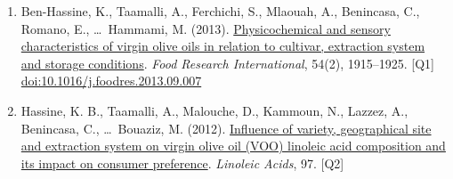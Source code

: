 \documentclass[10pt,a4paper]{article}
\newcommand{\doi}[1]{\href{https://doi.org/#1}{doi:#1}}
\newcommand{\Qu}[1]{[Q#1]}
\begin{document}
\begin{enumerate}
\item Ben-Hassine, K., Taamalli, A., Ferchichi, S., Mlaouah, A., Benincasa, C., Romano, E., \ldots\ Hammami, M. (2013). \href{https://doi.org/10.1016/j.foodres.2013.09.007}{Physicochemical and sensory characteristics of virgin olive oils in relation to cultivar, extraction system and storage conditions}. \emph{Food Research International}, 54(2), 1915--1925. \Qu1 \doi{10.1016/j.foodres.2013.09.007}
\item Hassine, K. B., Taamalli, A., Malouche, D., Kammoun, N., Lazzez, A., Benincasa, C., \ldots\ Bouaziz, M. (2012). \href{https://www.researchgate.net/publication/288652330_Influence_of_variety_geographical_site_and_extraction_system_on_virgin_olive_oil_VOO_linoleic_acid_composition_and_its_impact_on_consumer_preference}{Influence of variety, geographical site and extraction system on virgin olive oil (VOO) linoleic acid composition and its impact on consumer preference}. \emph{Linoleic Acids}, 97. \Qu2


\end{enumerate}
\end{document}
